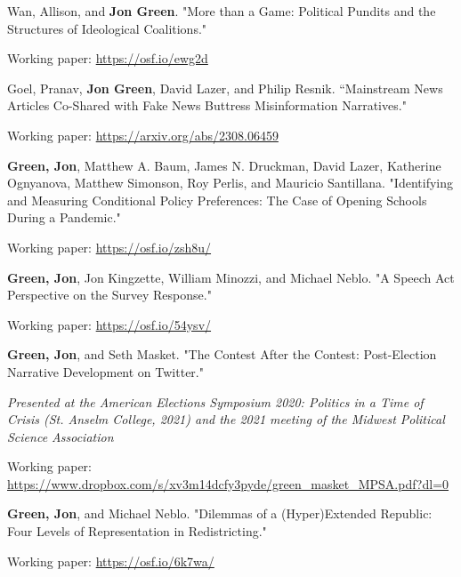 \documentclass[letterpaper]{article}
\renewenvironment{itemize}{
  \begin{list}{}{
    \setlength{\leftmargin}{1.5em}
  }
}{
  \end{list}
}
\begin{document}
\begin{itemize}
\item Wan, Allison, and \textbf{Jon Green}. "More than a Game: Political Pundits and the Structures of Ideological Coalitions." 
\begin{itemize}
\item Working paper: \url{https://osf.io/ewg2d}
\end{itemize}

\item Goel, Pranav, \textbf{Jon Green}, David Lazer, and Philip Resnik. ``Mainstream News Articles Co-Shared with Fake News Buttress Misinformation Narratives."
\begin{itemize}
\item Working paper: \url{https://arxiv.org/abs/2308.06459}
\end{itemize}

\item  \textbf{Green, Jon}, Matthew A. Baum, James N. Druckman, David Lazer, Katherine Ognyanova, Matthew Simonson, Roy Perlis, and Mauricio Santillana. "Identifying and Measuring Conditional Policy Preferences: The Case of Opening Schools During a Pandemic." 
\begin{itemize}
\item Working paper: \url{https://osf.io/zsh8u/}
\end{itemize}

\item \textbf{Green, Jon}, Jon Kingzette, William Minozzi, and Michael Neblo. "A Speech Act Perspective on the Survey Response." 
\begin{itemize}
\item Working paper: \url{https://osf.io/54ysv/}
\end{itemize}

\item \textbf{Green, Jon}, and Seth Masket. "The Contest After the Contest: Post-Election Narrative Development on Twitter." 
\begin{itemize}
\item \textit{Presented at the American Elections Symposium 2020: Politics in a Time of Crisis (St. Anselm College, 2021) and the 2021 meeting of the Midwest Political Science Association}
\item Working paper: \url{https://www.dropbox.com/s/xv3m14dcfy3pyde/green_masket_MPSA.pdf?dl=0}
\end{itemize}

\item \textbf{Green, Jon}, and Michael Neblo. "Dilemmas of a (Hyper)Extended Republic: Four Levels of Representation in Redistricting." 
\begin{itemize}
\item Working paper: \url{https://osf.io/6k7wa/}
\end{itemize}

\end{itemize}
\end{document}

